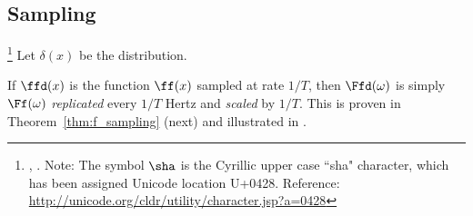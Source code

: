 \subsection{Sampling}
\label{sec:sampling}
\begin{definition}
\footnote{
  ,
  .
  Note: The symbol $\sha$ is the Cyrillic upper case ``sha" character, which 
  has been assigned Unicode location U+0428.
  Reference: \url{http://unicode.org/cldr/utility/character.jsp?a=0428}
  }
Let $\delta(x)$ be the  distribution.
\end{definition}

If $\ffd(x)$ is the function $\ff(x)$ sampled at rate $1/T$, 
then $\Ffd(\omega)$ is simply $\Ff(\omega)$
{\em replicated} every $1/T$ Hertz and {\em scaled} by $1/T$.
This is proven in Theorem~\ref{thm:f_sampling} (next) and 
illustrated in .


